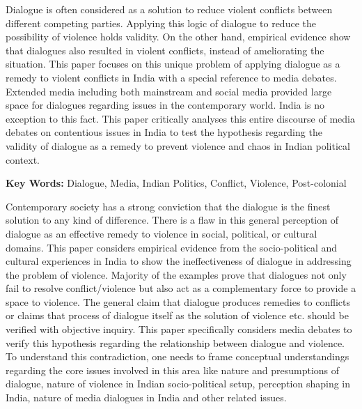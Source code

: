 \setcounter{figure}{0}
\setcounter{table}{0}
\setcounter{footnote}{0}

\label{2018-art5}

\begin{multicols}{2}


\noi
Dialogue is often considered as a solution to reduce violent conflicts between different competing
parties. Applying this logic of dialogue to reduce the possibility of violence holds validity. On the
other hand, empirical evidence show that dialogues also resulted in violent conflicts, instead of
ameliorating the situation. This paper focuses on this unique problem of applying dialogue as a
remedy to violent conflicts in India with a special reference to media debates. Extended media
including both mainstream and social media provided large space for dialogues regarding issues
in the contemporary world. India is no exception to this fact. This paper critically analyses this
entire discourse of media debates on contentious issues in India to test the hypothesis regarding
the validity of dialogue as a remedy to prevent violence and chaos in Indian political context.

\noi
\textbf{Key Words:} Dialogue, Media, Indian Politics, Conflict, Violence, Post-colonial


\noi
Contemporary society has a strong conviction that the dialogue is the finest solution to any kind
of difference. There is a flaw in this general perception of dialogue as an effective remedy to
violence in social, political, or cultural domains. This paper considers empirical evidence from
the socio-political and cultural experiences in India to show the ineffectiveness of dialogue in
addressing the problem of violence. Majority of the examples prove that dialogues not only fail
to resolve conflict/violence but also act as a complementary force to provide a space to violence.
The general claim that dialogue produces remedies to conflicts or claims that process of dialogue
itself as the solution of violence etc. should be verified with objective inquiry. This paper
specifically considers media debates to verify this hypothesis regarding the relationship between
dialogue and violence. To understand this contradiction, one needs to frame conceptual
understandings regarding the core issues involved in this area like nature and presumptions of
dialogue, nature of violence in Indian socio-political setup, perception shaping in India, nature of
media dialogues in India and other related issues.


\end{multicols}
